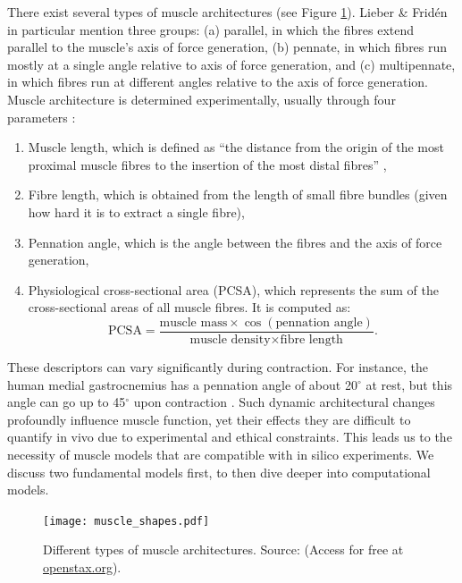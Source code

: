 \documentclass{sfuthesis}
\numberwithin{equation}{section}
\numberwithin{figure}{chapter}
\numberwithin{table}{chapter}
\theoremstyle{definition}
\begin{document}
There exist several types of muscle architectures (see Figure \ref{fig:muscle_architectures}). Lieber \& Frid\'{e}n \cite{LieberFriden2000} in particular mention three groups: (a) parallel, in which the fibres extend parallel to the muscle's axis of force generation, (b) pennate, in which fibres run mostly at a single angle relative to axis of force generation, and (c) multipennate, in which fibres run at different angles relative to the axis of force generation. Muscle architecture is determined experimentally, usually through four parameters \cite{LieberFriden2000}:
\begin{enumerate}
    \item Muscle length, which is defined as ``the distance from the origin of the most proximal muscle fibres to the insertion of the most distal fibres'' \cite{Lieber2010Book},
    \item Fibre length, which is obtained from the length of small fibre bundles (given how hard it is to extract a single fibre),
    \item Pennation angle, which is the angle between the fibres and the axis of force generation,
    \item Physiological cross-sectional area (PCSA), which represents the sum of the cross-sectional areas of all muscle fibres. It is computed as:
    \[
        \text{PCSA} = \dfrac{\text{muscle mass} \times \cos(\text{pennation angle})}{\text{muscle density} \times \text{fibre length}}.
    \]
\end{enumerate}

These descriptors can vary significantly during contraction. For instance, the human medial gastrocnemius has a pennation angle of about 20$^\circ$ at rest, but this angle can go up to 45$^\circ$ upon contraction \cite{LieberFriden2000}. 
Such dynamic architectural changes profoundly influence muscle function, yet their effects they are difficult to quantify in vivo due to experimental and ethical constraints. This leads us to the necessity of muscle models that are compatible with in silico experiments. We discuss two fundamental models first, to then dive deeper into computational models.

\begin{figure}
    \centering
    \texttt{[image: muscle\_shapes.pdf]}
    \caption{Different types of muscle architectures. Source: \cite{AnatomyPhysiologyBook2022} (Access for free at \url{openstax.org}).\label{fig:muscle_architectures}}
\end{figure}
\end{document}
